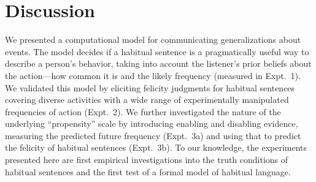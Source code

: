 \documentclass[10pt,letterpaper]{article}
\begin{document}



\section{Discussion}

We presented a computational model for communicating generalizations about events.
The model decides if a habitual sentence is a pragmatically useful way to describe a person's behavior, taking into account the listener's prior beliefs about the action---how common it is and the likely frequency (measured in Expt.~1).
We validated this model by eliciting felicity judgments for habitual sentences covering diverse activities with a wide range of experimentally manipulated frequencies of action (Expt.~2).
We further investigated the nature of the underlying ``propensity'' scale by introducing enabling and disabling evidence, measuring the predicted future frequency (Expt.~3a) and using that to predict the felicity of habitual sentences (Expt.~3b). 
To our knowledge, the experiments presented here are first empirical investigations into the truth conditions of habitual sentences and the first test of a formal model of habitual language.


\end{document}
